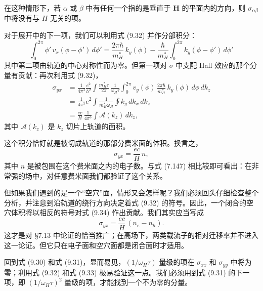 在这种情形下，若 $\alpha$ 或 $\beta$ 中有任何一个指的是垂直于 $\mathbf{H}$ 的平面内的方向，则 $\sigma_{\alpha\beta}$ 中将没有与 $H$ 无关的项。

对于展开中的下一项，我们可以利用式 (9.32) 并作分部积分：
\begin{equation*}
\int_{0}^{2\pi}\phi'\,v_{x}(\phi-\phi')\,d\phi'=\frac{2\pi\hbar}{m_H^{*}}\,k_{y}(\phi)-\frac{\hbar}{m_H^{*}}\int_{0}^{2\pi}k_{y}(\phi-\phi')\,d\phi' \tag{9.33}
\end{equation*}
其中第二项由轨道的中心对称性而为零。但第一项对 $\sigma$ 中支配 Hall 效应的那个分量有贡献：再次利用式 (9.32)，
\begin{align*}
\sigma_{yx}&=\frac{1}{4\pi^{3}}\frac{e^{2}}{\hbar^{2}}\int\frac{m_H^{*}\tau}{2\pi}\,\frac{1}{\omega_H\tau}\int_{0}^{2\pi}v_{y}(\phi)\,\frac{2\pi\hbar}{m_H^{*}}\,k_{y}(\phi)\,d\phi\,dk_{z}\\
&=\frac{1}{4\pi^{3}}e^{2}\int\frac{1}{m_H^{*}\omega_H}\oint k_{y}\,dk_{x}\,dk_{z}\\
&=\frac{ec}{H}\,\frac{1}{4\pi^{3}}\int\mathcal{A}(k_{z})\,dk_{z}, \tag{9.34}
\end{align*}
其中 $\mathcal{A}(k_{z})$ 是 $k_{z}$ 切片上轨道的面积。


这个积分恰好就是被切成轨道的那部分费米面的体积。换言之，
\begin{equation*}
\sigma_{yx}=\frac{ec}{H}\,n, \tag{9.35}
\end{equation*}
其中 $n$ 是被包围在这个费米面之内的电子数。与式 (7.147) 相比较即可看出：在非常强的场中，对任意费米面我们都验证了这个关系。

但如果我们遇到的是一个“空穴”面，情形又会怎样呢？我们必须回头仔细检查整个分析，并注意到沿轨道的绕行方向决定着式 (9.32) 的符号。因此，一个闭合的空穴体积将以相反的符号对式 (9.34) 作出贡献。我们其实应当写成
\begin{equation*}
\sigma_{yx}=\frac{ec}{H}\,(n_{e}-n_{h}). \tag{9.36}
\end{equation*}
这才是对 §7.13 中论证的恰当推广；在高场下，两类载流子的相对迁移率并不进入这一论证。但它只在电子面和空穴面都是闭合面时才适用。

回到式 (9.30) 和式 (9.31)，显而易见，$(1/\omega_H\tau)$ 量级的项在 $\sigma_{xx}$ 和 $\sigma_{yy}$ 中将为零；利用式 (9.32) 和式 (9.33) 极易验证这一点。我们必须用到式 (9.31) 的下一项，即 $(1/\omega_H\tau)^{2}$ 量级的项，才能找到一个不为零的分量。

